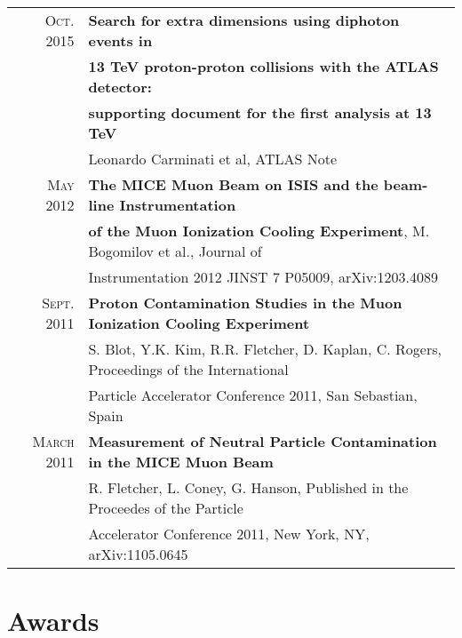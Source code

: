 \documentclass[a4paper,10pt]{article} %
\begin{document}
\begin{tabular}{rl}
\textsc{Oct.} 2015 & \textbf{Search for extra dimensions using diphoton events in} \\
									 & \textbf{13 TeV proton-proton collisions with the ATLAS detector:} \\
									 & \textbf{supporting document for the first analysis at 13 TeV} \\
									 & Leonardo Carminati et al, ATLAS Note \\
\textsc{May} 2012  & \textbf{The MICE Muon Beam on ISIS and the beam-line Instrumentation} \\
                   & \textbf{of the Muon Ionization Cooling Experiment}, M. Bogomilov et al., Journal of \\
				   & Instrumentation 2012 JINST 7 P05009, arXiv:1203.4089 \\
\textsc{Sept.} 2011 & \textbf{Proton Contamination Studies in the Muon Ionization Cooling Experiment} \\
					& S. Blot, Y.K. Kim, R.R. Fletcher, D. Kaplan, C. Rogers, Proceedings of the International \\
					& Particle Accelerator Conference 2011, San Sebastian, Spain \\
\textsc{March} 2011 & \textbf{Measurement of Neutral Particle Contamination in the MICE Muon Beam}\\
					& R. Fletcher, L. Coney, G. Hanson, Published in the Proceedes of the Particle \\
                    & Accelerator Conference 2011, New York, NY, arXiv:1105.0645\\

\end{tabular}


\section{Awards}
\end{document}
